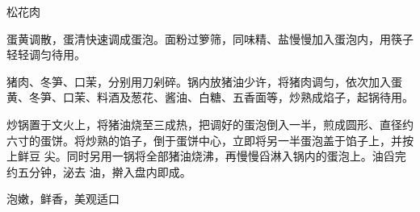 \begin{recipe}{松花肉}

\ingredients


\preparation

\step 蛋黄调散，蛋清快速调成蛋泡。面粉过箩筛，同味精、盐慢慢加入蛋泡内，用筷子
轻轻调匀待用。

\step 猪肉、冬笋、口茉，分别用刀剁碎。锅内放猪油少许，将猪肉调匀，依次加入蛋
黄、冬笋、口茉、料酒及葱花、酱油、白糖、五香面等，炒熟成焰子，起锅待用。

\step 炒锅置于文火上，将猪油烧至三成热，把调好的蛋泡倒入一半，煎成圆形、直径约
六寸的蛋饼。将炒熟的馅子，倒于蛋饼中心，立即将另一半蛋泡盖于馅子上，并按上鲜豆
尖。同时另用一锅将全部猪油烧沸，再慢慢舀淋入锅内的蛋泡上。油舀完约五分钟，泌去
油，擀入盘内即成。

\features

泡嫩，鲜香，美观适口

\end{recipe}

